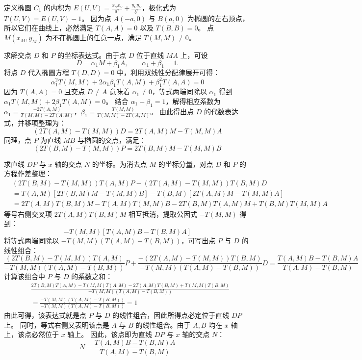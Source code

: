 \begin{solution}
定义椭圆 $C_1$ 的内积为 $E(U,V) = \frac{x_U x_V}{a^2} + \frac{y_U y_V}{b^2}$，极化式为 $T(U,V) = E(U,V) - 1$。
因为点 $A(-a,0)$ 与 $B(a,0)$ 为椭圆的左右顶点，所以它们在曲线上，必然满足 $T(A,A)=0$ 以及 $T(B,B)=0$。
点 $M(x_M, y_M)$ 为不在椭圆上的任意一点，满足 $T(M,M) \neq 0$。

求解交点 $D$ 和 $P$ 的坐标表达式。由于点 $D$ 位于直线 $MA$ 上，可设
$$D = \alpha_1 M + \beta_1 A,\qquad \alpha_1 + \beta_1 = 1.$$
将点 $D$ 代入椭圆方程 $T(D,D)=0$ 中，利用双线性分配律展开可得：
$$ \alpha_1^2 T(M,M) + 2\alpha_1 \beta_1 T(A,M) + \beta_1^2 T(A,A) = 0 $$
因为 $T(A,A)=0$ 且交点 $D \neq A$ 意味着 $\alpha_1 \neq 0$，等式两端同除以 $\alpha_1$ 得到 $\alpha_1 T(M,M) + 2\beta_1 T(A,M) = 0$。
结合 $\alpha_1+\beta_1=1$，解得相应系数为 $\alpha_1 = \frac{-2T(A,M)}{T(M,M) - 2T(A,M)}$，$\beta_1 = \frac{T(M,M)}{T(M,M) - 2T(A,M)}$。
由此得出点 $D$ 的代数表达式，并移项整理为：
$$ (2T(A,M) - T(M,M))D = 2T(A,M)M - T(M,M)A $$
同理，点 $P$ 为直线 $MB$ 与椭圆的交点，满足：
$$ (2T(B,M) - T(M,M))P = 2T(B,M)M - T(M,M)B $$

求直线 $DP$ 与 $x$ 轴的交点 $N$ 的坐标。为消去点 $M$ 的坐标分量，对点 $D$ 和 $P$ 的方程作差整理：
\begin{align*}
&(2T(B,M)-T(M,M))T(A,M)P - (2T(A,M)-T(M,M))T(B,M)D \\
&= T(A,M)[2T(B,M)M - T(M,M)B] - T(B,M)[2T(A,M)M - T(M,M)A] \\
&= 2T(A,M)T(B,M)M - T(A,M)T(M,M)B - 2T(B,M)T(A,M)M + T(B,M)T(M,M)A
\end{align*}
等号右侧交叉项 $2T(A,M)T(B,M)M$ 相互抵消，提取公因式 $-T(M,M)$ 得到：
$$ -T(M,M) [T(A,M)B - T(B,M)A] $$
将等式两端同除以 $-T(M,M)(T(A,M)-T(B,M))$，可写出点 $P$ 与 $D$ 的线性组合：
$$ \frac{(2T(B,M)-T(M,M))T(A,M)}{-T(M,M)(T(A,M)-T(B,M))} P + \frac{-(2T(A,M)-T(M,M))T(B,M)}{-T(M,M)(T(A,M)-T(B,M))} D = \frac{T(A,M)B - T(B,M)A}{T(A,M)-T(B,M)} $$
计算该组合中 $P$ 与 $D$ 的系数之和：
\begin{align*}
&\frac{2T(B,M)T(A,M) - T(M,M)T(A,M) - 2T(A,M)T(B,M) + T(M,M)T(B,M)}{-T(M,M)(T(A,M)-T(B,M))} \\
 &= \frac{-T(M,M)(T(A,M)-T(B,M))}{-T(M,M)(T(A,M)-T(B,M))} = 1 
\end{align*}
由此可得，该表达式就是点 $P$ 与 $D$ 的线性组合，因此所得点必定位于直线 $DP$ 上。
同时，等式右侧又表明该点是 $A$ 与 $B$ 的线性组合。由于 $A, B$ 均在 $x$ 轴上，该点必然位于 $x$ 轴上。
因此，该点即为直线 $DP$ 与 $x$ 轴的交点 $N$：
$$ N = \frac{T(A,M)B - T(B,M)A}{T(A,M) - T(B,M)} $$


\end{solution}
